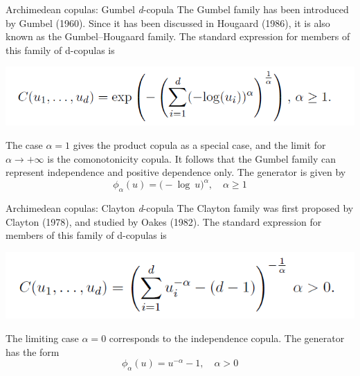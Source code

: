 \documentclass[11pt]{beamer}
\theoremstyle{plain}
\theoremstyle{definition}
\theoremstyle{remark}
\begin{document}
\begin{frame}{Archimedean copulas: Gumbel \textit{d}-copula}
		The Gumbel family has been introduced by Gumbel (1960). Since it has been discussed in Hougaard (1986), it is also known as 
		the Gumbel–Hougaard family. The standard expression for members of this family of d-copulas is
		\begin{center}
		\includegraphics[scale=.5]{fig/copule_archimedee_gumbel.PNG} 
		\end{center}
		The case $\alpha = 1$ gives the product copula as a special case, and the limit for $\alpha \rightarrow +\infty$ is the 
		comonotonicity copula. It follows that the Gumbel family can represent independence and positive dependence only. The 
		generator is given by 
		\begin{equation}
		\phi_\alpha(u) = \bigl( -\log \> u \bigr)^\alpha, \quad \alpha \ge 1
		\end{equation}
\end{frame}
%
\begin{frame}{Archimedean copulas: Clayton \textit{d}-copula}
		 The Clayton family was first proposed by Clayton (1978), and studied by Oakes (1982). The standard expression for members 
		 of this family of d-copulas is
		 \begin{center}
		 \includegraphics[scale=.5]{fig/copule_archimedee_clayton.PNG} 
		 \end{center}
		 The limiting case $\alpha = 0$ corresponds to the independence copula. The generator has the form 
		 \begin{equation}
		 \phi_\alpha(u) = u^{-\alpha}-1, \quad \alpha > 0
		\end{equation}
 \end{frame}
%
\end{document}
